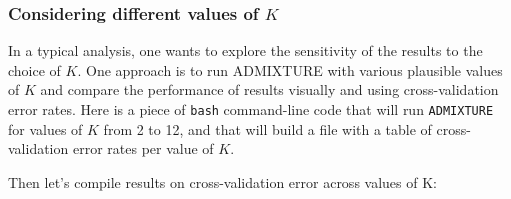 \documentclass[smallextended]{svjour3}       %
\newenvironment{Shaded}{\begin{snugshade}}{\end{snugshade}}
\newcommand{\KeywordTok}[1]{\textcolor[rgb]{0.13,0.29,0.53}{\textbf{#1}}}
\newcommand{\StringTok}[1]{\textcolor[rgb]{0.31,0.60,0.02}{#1}}
\newcommand{\CommentTok}[1]{\textcolor[rgb]{0.56,0.35,0.01}{\textit{#1}}}
\newcommand{\FunctionTok}[1]{\textcolor[rgb]{0.00,0.00,0.00}{#1}}
\newcommand{\VariableTok}[1]{\textcolor[rgb]{0.00,0.00,0.00}{#1}}
\newcommand{\OperatorTok}[1]{\textcolor[rgb]{0.81,0.36,0.00}{\textbf{#1}}}
\newcommand{\BuiltInTok}[1]{#1}
\newcommand{\ExtensionTok}[1]{#1}
\newcommand{\NormalTok}[1]{#1}
\begin{document}
\subsubsection{\texorpdfstring{Considering different values of
\(K\)}{Considering different values of K}}\label{considering-different-values-of-k}

In a typical analysis, one wants to explore the sensitivity of the
results to the choice of \(K\). One approach is to run ADMIXTURE with
various plausible values of \(K\) and compare the performance of results
visually and using cross-validation error rates. Here is a piece of
\texttt{bash} command-line code that will run \texttt{ADMIXTURE} for
values of \(K\) from 2 to 12, and that will build a file with a table of
cross-validation error rates per value of \(K\).

\begin{Shaded}
\end{Shaded}

Then let's compile results on cross-validation error across values of K:

\begin{Shaded}
\end{Shaded}
\end{document}
